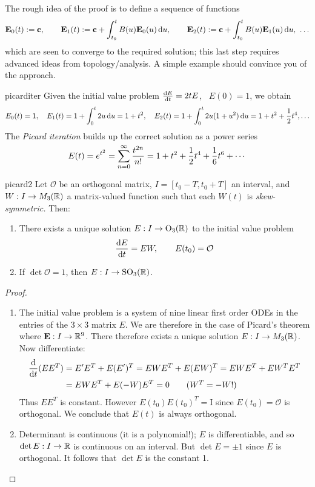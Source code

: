 \goodbreak

The rough idea of the proof is to define a sequence of functions
\[
	\vE_0(t):=\vc,\qquad \vE_1(t):=\vc+\int_{t_0}^tB(u)\vE_0(u)\,\du,\qquad \vE_2(t):=\vc+\int_{t_0}^tB(u)\vE_1(u)\,\du,\ \ldots
\]
which are seen to converge to the required solution; this last step requires advanced ideas from topology/analysis. A simple example should convince you of the approach.

\begin{example}{}{picarditer}
	Given the initial value problem $\diff[E]{t}=2tE$, \ $E(0)=1$, we obtain
	\begin{gather*}
		E_0(t)=1,\quad E_1(t)=1+\int_0^t 2u\,\du=1+t^2,\quad
		E_2(t)=1+\int_0^t2u(1+u^2)\,\du =1+t^2+\frac 12t^4,\ldots
	\end{gather*}
	The \emph{Picard iteration} builds up the correct solution as a power series
	\[
		E(t)=e^{t^2}=\smash[t]{\sum\limits_{n=0}^\infty\frac{t^{2n}}{n!}}=1+t^2+\frac 12t^4+\frac 16t^6+\cdots
	\]
\end{example}



\begin{cor}{}{picard2}
	Let $\mathcal O$ be an orthogonal matrix, $I=[t_0-T,t_0+T]$ an interval, and $W:I\to M_3(\R)$ a matrix-valued function such that each $W(t)$ is \emph{skew-symmetric.}  Then:
	\begin{enumerate}\itemsep0pt
	  \item There exists a unique solution $E:I\to \rO_3(\R)$ to the initial value problem
	  \[
	  	\diff[E]{t}=E W,\qquad E(t_0)=\mathcal O
	  \]
	  \item If $\det\mathcal O=1$, then $E:I\to\rSO_3(\R)$.
	\end{enumerate}
\end{cor}

\begin{proof}
	\begin{enumerate}
	  \item The initial value problem is a system of nine linear first order ODEs in the entries of the $3\times 3$ matrix $E$. We are therefore in the case of Picard's theorem where $\vE:I\to\R^9$. There therefore exists a unique solution $E:I\to M_3(\R)$. Now differentiate:
	  \begin{align*}
	  	\diff t(EE^T)&=E'E^T+E(E')^T =EWE^T+E(EW)^T =EWE^T+EW^TE^T\\
	  	&=EWE^T+E(-W)E^T=0 \tag{$W^T=-W$!}
	  \end{align*}
	  Thus $EE^T$ is constant. However $E(t_0)E(t_0)^T=\mathrm I$ since $E(t_0)=\mathcal O$ is orthogonal. We conclude that $E(t)$ is always orthogonal.
	  \item Determinant is continuous (it is a polynomial!); $E$ is differentiable, and so $\det E:I\to\R$ is continuous on an interval. But $\det E=\pm 1$ since $E$ is orthogonal. It follows that $\det E$ is the constant 1.\qedhere
	\end{enumerate}
\end{proof}

